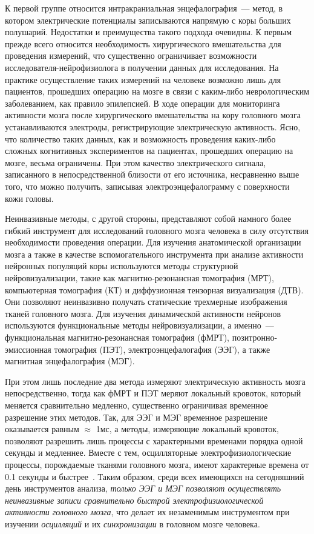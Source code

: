 К первой группе относится интракраниальная энцефалография~--- метод, в котором
электрические потенциалы записываются напрямую с коры больших полушарий.
Недостатки и преимущества такого подхода очевидны. К первым прежде всего
относится необходимость хирургического вмешательства для проведения измерений,
что существенно ограничивает возможности исследователя-нейрофизиолога в
получении данных для исследования.  На практике осуществление таких измерений
на человеке возможно лишь для пациентов, прошедших операцию на мозге в связи с
каким-либо неврологическим заболеванием, как правило эпилепсией.  В ходе
операции для мониторинга активности мозга после хирургического вмешательства на
кору головного мозга устанавливаются электроды, регистрирующие электрическую
активность.  Ясно, что количество таких данных, как и  возможность проведения
каких-либо сложных когнитивных экспериментов на пациентах, прошедших операцию
на мозге, весьма ограничены.  При этом качество электрического сигнала,
записанного в непосредственной близости от его источника, несравненно выше
того, что можно получить, записывая электроэнцефалограмму с поверхности кожи
головы.

Неинвазивные методы, с другой стороны, представляют собой намного более гибкий
инструмент для исследований головного мозга человека в силу отсутствия
необходимости проведения операции.  Для изучения анатомической организации
мозга а также в качестве вспомогательного инструмента при анализе активности
нейронных популяций коры используются методы структурной нейровизуализации,
такие как магнитно-резонансная томография (МРТ), компьютерная томография (КТ) и
диффузионная тензорная визуализация (ДТВ).  Они позволяют неинвазивно получать
статические трехмерные изображения тканей головного мозга.  Для изучения
динамической активности нейронов используются функциональные методы
нейровизуализации, а именно~---  функциональная магнитно-резонансная томография
(фМРТ), позитронно-эмиссионная томография (ПЭТ), электроэнцефалогафия (ЭЭГ), а
также магнитная энцефалография (МЭГ).

При этом лишь последние два метода измеряют электрическую активность мозга
непосредственно, тогда как фМРТ и ПЭТ меряют локальный кровоток, который
меняется сравнительно медленно, существенно ограничивая временное разрешение
этих методов.  Так, для ЭЭГ и МЭГ временное разрешение оказывается равным
$\approx$ 1мс, а методы, измеряющие локальный кровоток, позволяют разрешить
лишь процессы с характерными временами порядка одной секунды и медленнее.
Вместе с тем, осцилляторные электрофизиологические процессы, порождаемые
тканями головного мозга, имеют характерные времена от 0.1 секунды и быстрее~\cite{buzsaki}.
Таким образом, среди
всех имеющихся на сегодняшний день инструментов анализа,
\emph{только ЭЭГ и МЭГ позволяют осуществлять неинвазивные записи сравнительно быстрой
электрофизиологической активности головного мозга}, что делает их незаменимым
инструментом при изучении \emph{осцилляций} и их \emph{синхронизации} в головном
мозге человека.

